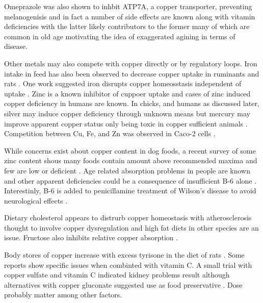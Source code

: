 {Omeprazole was also shown to inhbit ATP7A, a copper transporter,
preventing melanogenisis 
\cite{Matsui_Petris_Niki_Omeprazole_Gastric_Proton_2015}
and in fact a number of side effects are known 
along with vitamin deficiencies 
\cite{PMC10248387} with the latter likely contributors to the former
many of which are common in old age motivating the idea of exaggerated
agining in terms of disease. 

Other metals may also compete with copper directly or
by regulatory loops.
Iron intake in feed has also been observed to decrease
copper uptake in ruminants 
\cite{Clarkson_Paine_Kendall_Evaluation_solubility_2021} 
and rats
\cite{Lee_Ha_Collins_Dietary_Iron_Intake_2021}
.
One work suggested  iron disrupts copper homeosstasis
independent of uptake
\cite{Ha_Doguer_Collins_Consumption_high_2017}.
Zinc is a known inhibitor of cuppoer uptake
and cases of zinc induced copper deficiency in humans
are known\cite{PMC7495772}.
In chicks, and humans as discussed later, silver may induce
copper deficiency through unknown means but mercury
may improve apparent copper status only being toxic 
in copper sufficient animals
\cite{Hill_Starcher_Matrone_Mercury_Silver_Interrelationships_1964}.
Competition between Cu, Fe, and Zn was observed in Caco-2
cells \cite{ARREDONDO_MARTINEZ_NUNEZ_Inhibition_iron_2006}.

While concerns exist about copper content in dog foods, a
recent survey of some zinc content shous many foods 
contain amount above recommended maxima and few are
low or deficient \cite{PMC8066201}.
Age related absorption problems in people
are known \cite{PMC5133110} and other apparent deficiencies 
could be a consequence of
insufficient B-6 alone \cite{PMID7814236}.
Interestinly, B-6 is added to penicillamine treatment of
Wilson's disease to avoid neurological effects
\cite{PMC3526418}.

Dietary cholesterol appears to distrurb copper homeostasis 
with atherosclerosis thought to involve copper dysregulation
\cite{PMID33661473}
and high fat diets in other species \cite{PMC5167165} are an issue.
Fructose also inhibits relative copper absorption
\cite{ODell_Fructose_mineral_metabolism_1993}
\cite{PMID7825519}.



Body stores of copper increase with excess tyrisone in the diet
of rats
\cite{Yang_Noda_Kato_Elevated_Intestinal_Absorption_}.
Some reports show specific issues when combinted with vitamin C.
A small trial with copper sulfate and vitamin C indicated kidney problems
result 
\cite{Jiang_Sui_Hong_Combined_Administration_2023}
although alternatives with copper gluconate 
suggested use as food preservative
\cite{Graf_Copper_Ascorbate_1994}
. Dose probably matter among other factors.  

} %


